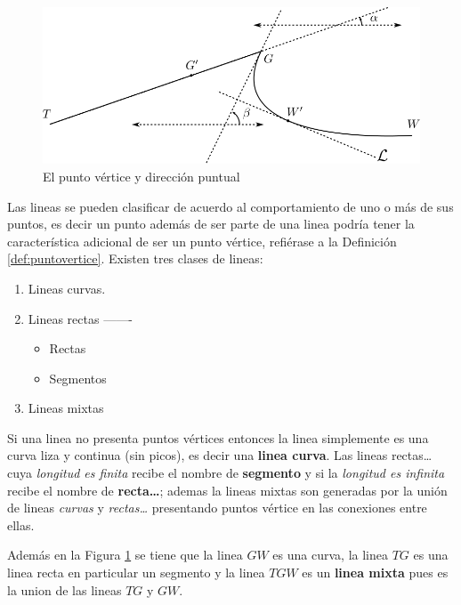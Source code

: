 \documentclass[16pt,]{krantz}
\providecommand{\tightlist}{%
  \setlength{\itemsep}{0pt}\setlength{\parskip}{0pt}}
\theoremstyle{definition}
\theoremstyle{definition}
\theoremstyle{definition}
\theoremstyle{definition}
\theoremstyle{remark}
\begin{document}
\begin{figure}[!ht]

{\centering \includegraphics{tangente} 

}

\caption{El punto vértice y dirección puntual}\label{fig:tangente}
\end{figure}

Las lineas se pueden clasificar de acuerdo al comportamiento de uno o más de sus puntos, es decir un punto además de ser parte de una linea podría tener la característica adicional de ser un punto vértice, refiérase a la Definición \ref{def:puntovertice}. Existen tres clases de lineas:

\begin{enumerate}
\def\labelenumi{\arabic{enumi}.}
\item
  Lineas curvas.
\item
  Lineas rectas -------

  \begin{itemize}
  \tightlist
  \item
    Rectas
  \item
    Segmentos
  \end{itemize}
\item
  Lineas mixtas
\end{enumerate}

Si una linea no presenta puntos vértices entonces la linea simplemente es una curva liza y continua (sin picos), es decir una \textbf{linea curva}. Las lineas rectas\ldots{} cuya \emph{longitud es finita} recibe el nombre de \textbf{segmento} y si la \emph{longitud es infinita} recibe el nombre de \textbf{recta\ldots{}}; ademas la lineas mixtas son generadas por la unión de lineas \emph{curvas} y \emph{rectas\ldots{}} presentando puntos vértice en las conexiones entre ellas.

Además en la Figura \ref{fig:tangente} se tiene que la linea \(GW\) es una curva, la linea \(TG\) es una linea recta en particular un segmento y la linea \(TGW\) es un \textbf{linea mixta} pues es la union de las lineas \(TG\) y \(GW\).
\end{document}
